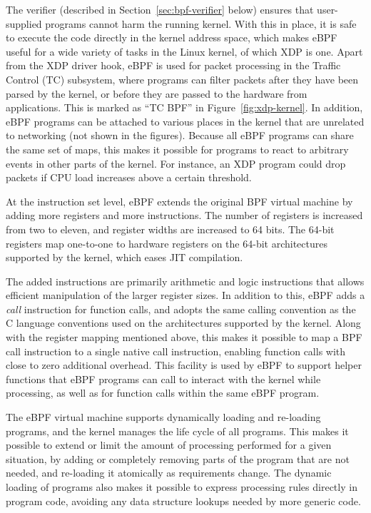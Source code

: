 \documentclass[sigconf]{acmart}
\begin{document}
The verifier (described in Section~\ref{sec:bpf-verifier} below) ensures that
user-supplied programs cannot harm the running kernel. With this in place, it is
safe to execute the code directly in the kernel address space, which makes eBPF
useful for a wide variety of tasks in the Linux kernel, of which XDP is one.
Apart from the XDP driver hook, eBPF is used for packet processing in the
Traffic Control (TC) subsystem, where programs can filter packets after they
have been parsed by the kernel, or before they are passed to the hardware from
applications. This is marked as ``TC BPF'' in Figure~\ref{fig:xdp-kernel}. In
addition, eBPF programs can be attached to various places in the kernel that are
unrelated to networking (not shown in the figures). Because all eBPF programs
can share the same set of maps, this makes it possible for programs to react to
arbitrary events in other parts of the kernel. For instance, an XDP program
could drop packets if CPU load increases above a certain threshold.

At the instruction set level, eBPF extends the original BPF virtual machine by
adding more registers and more instructions. The number of registers is
increased from two to eleven, and register widths are increased to 64 bits. The
64-bit registers map one-to-one to hardware registers on the 64-bit
architectures supported by the kernel, which eases JIT compilation.

The added instructions are primarily arithmetic and logic instructions that
allows efficient manipulation of the larger register sizes. In addition to this,
eBPF adds a \emph{call} instruction for function calls, and adopts the same
calling convention as the C language conventions used on the architectures
supported by the kernel. Along with the register mapping mentioned above, this
makes it possible to map a BPF call instruction to a single native call
instruction, enabling function calls with close to zero additional overhead.
This facility is used by eBPF to support helper functions that eBPF programs can call to
interact with the kernel while processing, as well as for function calls within
the same eBPF program.

The eBPF virtual machine supports dynamically loading and re-loading programs,
and the kernel manages the life cycle of all programs. This makes it possible to
extend or limit the amount of processing performed for a given situation, by
adding or completely removing parts of the program that are not needed, and
re-loading it atomically as requirements change. The dynamic loading of programs
also makes it possible to express processing rules directly in program code,
avoiding any data structure lookups needed by more generic code.
\end{document}
